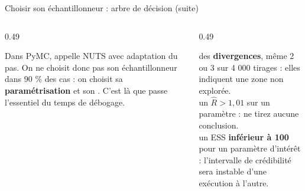 \begin{frame}{Choisir son échantillonneur : arbre de décision (suite)}
\begin{columns}[t]
\begin{column}{0.49\textwidth}
\begin{abox}
Dans PyMC,  appelle NUTS avec adaptation du pas. On ne choisit
donc pas son échantillonneur dans 90 \% des cas : on choisit sa
\textbf{paramétrisation} et son . C'est là que passe
l'essentiel du temps de débogage.
\end{abox}
\end{column}
\begin{column}{0.49\textwidth}
\begin{wbox}
\nok{} des \textbf{divergences}, même 2 ou 3 sur 4 000 tirages :\;
elles indiquent une zone non explorée.\\
\nok{} un $\hat R > 1{,}01$ sur un paramètre : \; ne tirez aucune conclusion.\\
\nok{} un ESS \textbf{inférieur à 100} pour un paramètre d'intérêt : \; l'intervalle
de crédibilité sera instable d'une exécution à l'autre.
\end{wbox}
\end{column}
\end{columns}
\end{frame}

